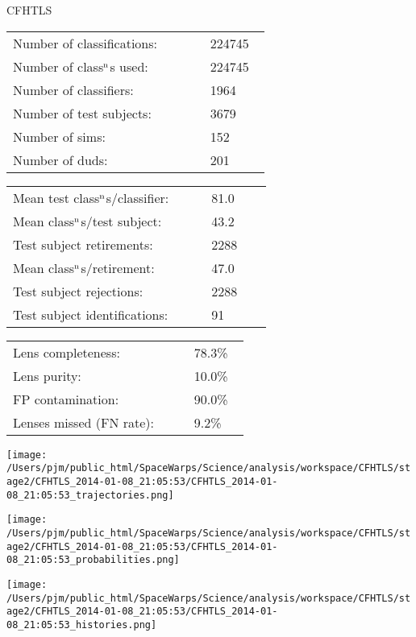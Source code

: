 \documentclass[letterpaper,12pt]{article}
\begin{document}
\begin{minipage}{0.42\linewidth}
{\LARGE CFHTLS}\newline
\medskip

\begin{tabular}{|p{0.65\linewidth}p{0.2\linewidth}|}
\hline
Number of classifications:         & 224745   \\ 
Number of class$^{\rm n}$s used:  & 224745   \\ 
Number of classifiers:             & 1964   \\ 
Number of test subjects:           & 3679   \\ 
Number of sims:                    & 152   \\ 
Number of duds:                    & 201   \\ 
\hline
\end{tabular}
\begin{tabular}{|p{0.65\linewidth}p{0.2\linewidth}|}
\hline
Mean test class$^{\rm n}$s/classifier: & 81.0 \\ 
Mean class$^{\rm n}$s/test subject:    & 43.2 \\ 
Test subject retirements:               & 2288   \\ 
Mean class$^{\rm n}$s/retirement:      & 47.0 \\ 
Test subject rejections:                & 2288   \\ 
Test subject identifications:           & 91   \\ 
\hline
\end{tabular}
\begin{tabular}{|p{0.65\linewidth}p{0.2\linewidth}|}
\hline
Lens completeness:         & 78.3\% \\ 
Lens purity:               & 10.0\% \\ 
FP contamination:          & 90.0\% \\ 
Lenses missed (FN rate):   & 9.2\% \\ 
\hline
\end{tabular}
\end{minipage}\hfill
\begin{minipage}{0.56\linewidth}
\texttt{[image: /Users/pjm/public\_html/SpaceWarps/Science/analysis/workspace/CFHTLS/stage2/CFHTLS\_2014-01-08\_21:05:53/CFHTLS\_2014-01-08\_21:05:53\_trajectories.png]}
\end{minipage}

\vspace{-1\baselineskip}
\begin{minipage}{\linewidth}
\begin{minipage}{0.48\linewidth}
\texttt{[image: /Users/pjm/public\_html/SpaceWarps/Science/analysis/workspace/CFHTLS/stage2/CFHTLS\_2014-01-08\_21:05:53/CFHTLS\_2014-01-08\_21:05:53\_probabilities.png]}
\end{minipage}
\begin{minipage}{0.48\linewidth}
\texttt{[image: /Users/pjm/public\_html/SpaceWarps/Science/analysis/workspace/CFHTLS/stage2/CFHTLS\_2014-01-08\_21:05:53/CFHTLS\_2014-01-08\_21:05:53\_histories.png]}
\end{minipage}
\end{minipage}
\end{document}
